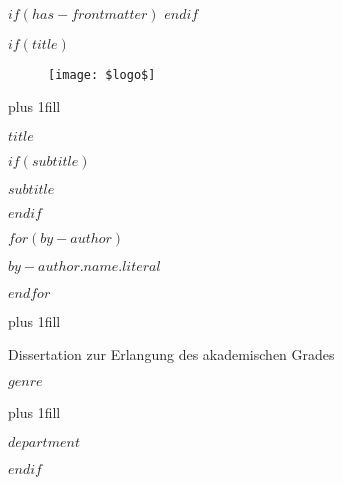 $if(has-frontmatter)$
    \frontmatter
$endif$

$if(title)$
    \cleardoublepage
    \thispagestyle{empty}

    {\centering

        \begin{figure}[h!]
            \begin{center}
                \texttt{[image: \$logo\$]}
            \end{center}
        \end{figure}
        
        \hbox{}\vskip 0cm plus 1fill
        
        {\Huge\bfseries $title$ \par}
        
        $if(subtitle)$
            \vspace{3ex}
            {\Huge\bfseries $subtitle$ \par}
        $endif$
        
        \vspace{12ex}
        $for(by-author)$
            {\LARGE\bfseries $by-author.name.literal$ \par}
        $endfor$%
            
        \vskip 0cm plus 1fill

        {\large Dissertation zur Erlangung des akademischen Grades}
        
        \vspace{3ex}
            
        {\Large $genre$ \par}
        
        \vskip 0cm plus 1fill         
            
        {\large $department$ \par}
        

    }
$endif$

\cleardoublepage
